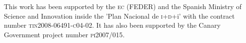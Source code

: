 This work has been supported by the \textsc{ec} (\textsc{FEDER}) and
the Spanish Ministry of Science and Innovation inside the 'Plan Nacional de
\textsc{i+d}+i' with the contract number \textsc{tin2008-06491-c04-02}.
%
It has also been supported by the Canary Government project number
\textsc{pi2007/015}.

